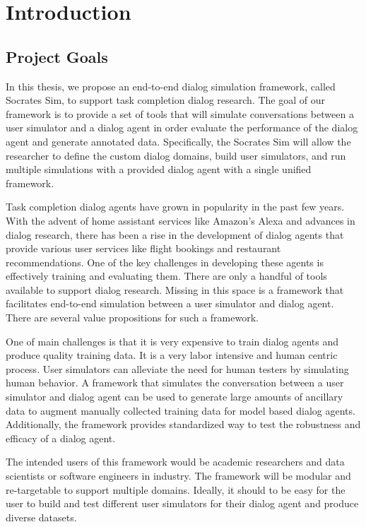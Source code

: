 \chapter{Introduction}


\section{Project Goals}

In this thesis, we propose an end-to-end dialog simulation framework, called Socrates Sim, to support task completion dialog research. The goal of our framework is to provide a set of tools that will simulate conversations between a user simulator and a dialog agent in order evaluate the performance of the dialog agent and generate annotated data. Specifically, the Socrates Sim will allow the researcher to define the custom dialog domains, build user simulators, and run multiple simulations with a provided dialog agent with a single unified framework. 

Task completion dialog agents have grown in popularity in the past few years. With the advent of home assistant services like Amazon's Alexa and advances in dialog research, there has been a rise in the development of dialog agents that provide various user services like flight bookings and restaurant recommendations. One of the key challenges in developing these agents is effectively training and evaluating them. There are only a handful of tools available to support dialog research. Missing in this space is a framework that facilitates end-to-end simulation between a user simulator and dialog agent. There are several value propositions for such a framework.

One of main challenges is that it is very expensive to train dialog agents and produce quality training data. It is a very labor intensive and human centric process. User simulators can alleviate the need for human testers by simulating human behavior. A framework that simulates the conversation between a user simulator and dialog agent can be used to generate large amounts of ancillary data to augment manually collected training data for model based dialog agents. Additionally, the framework provides standardized way to test the robustness and efficacy of a dialog agent.

The intended users of this framework would be academic researchers and data scientists or software engineers in industry. The framework will be modular and re-targetable to support multiple domains. Ideally, it should to be easy for the user to build and test different user simulators for their dialog agent and produce diverse datasets. 

